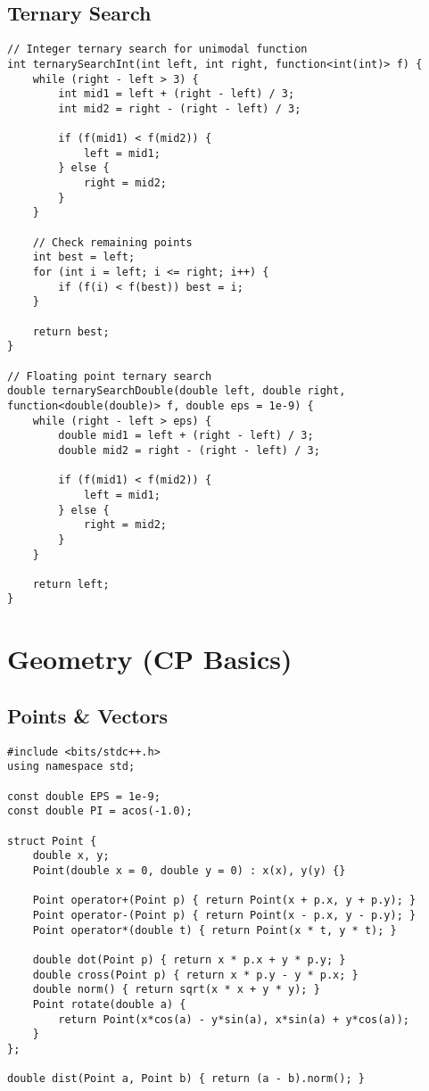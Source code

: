 \documentclass[11pt,a4paper]{article}
\begin{document}
\subsection{Ternary Search}
\begin{lstlisting}
// Integer ternary search for unimodal function
int ternarySearchInt(int left, int right, function<int(int)> f) {
    while (right - left > 3) {
        int mid1 = left + (right - left) / 3;
        int mid2 = right - (right - left) / 3;
        
        if (f(mid1) < f(mid2)) {
            left = mid1;
        } else {
            right = mid2;
        }
    }
    
    // Check remaining points
    int best = left;
    for (int i = left; i <= right; i++) {
        if (f(i) < f(best)) best = i;
    }
    
    return best;
}

// Floating point ternary search
double ternarySearchDouble(double left, double right, function<double(double)> f, double eps = 1e-9) {
    while (right - left > eps) {
        double mid1 = left + (right - left) / 3;
        double mid2 = right - (right - left) / 3;
        
        if (f(mid1) < f(mid2)) {
            left = mid1;
        } else {
            right = mid2;
        }
    }
    
    return left;
}
\end{lstlisting}

\newpage
\section{Geometry (CP Basics)}

\subsection{Points \& Vectors}
\begin{lstlisting}[caption={Point and Vector Structure}]
#include <bits/stdc++.h>
using namespace std;

const double EPS = 1e-9;
const double PI = acos(-1.0);

struct Point {
    double x, y;
    Point(double x = 0, double y = 0) : x(x), y(y) {}
    
    Point operator+(Point p) { return Point(x + p.x, y + p.y); }
    Point operator-(Point p) { return Point(x - p.x, y - p.y); }
    Point operator*(double t) { return Point(x * t, y * t); }
    
    double dot(Point p) { return x * p.x + y * p.y; }
    double cross(Point p) { return x * p.y - y * p.x; }
    double norm() { return sqrt(x * x + y * y); }
    Point rotate(double a) { 
        return Point(x*cos(a) - y*sin(a), x*sin(a) + y*cos(a));
    }
};

double dist(Point a, Point b) { return (a - b).norm(); }
\end{lstlisting}
\end{document}
